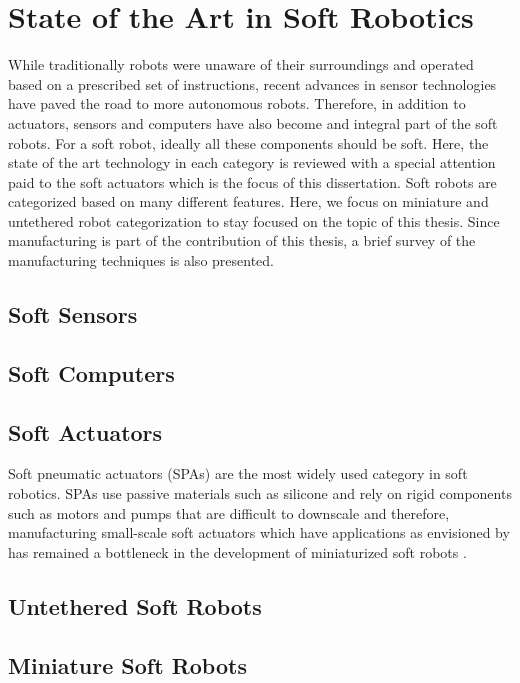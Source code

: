 \section{State of the Art in Soft Robotics}
While traditionally robots were unaware of their surroundings and operated based on a prescribed set of instructions, recent advances in sensor technologies have paved the road to more autonomous robots. Therefore, in addition to actuators, sensors and computers have also become and integral part of the soft robots. For a soft robot, ideally all these components should be soft. Here, the state of the art technology in each category is reviewed with a special attention paid to the soft actuators which is the focus of this dissertation. Soft robots are categorized based on many different features. Here, we focus on miniature and untethered robot categorization to stay focused on the topic of this thesis. Since manufacturing is part of the contribution of this thesis, a brief survey of the manufacturing techniques is also presented.
\subsection{Soft Sensors}
\subsection{Soft Computers}
\subsection{Soft Actuators}
Soft pneumatic actuators (SPAs) \cite{Gorissen2017, branyan2017soft} are the most widely used category in soft robotics. SPAs use passive materials such as silicone and rely on rigid components such as motors and pumps that are difficult to downscale and therefore, manufacturing small-scale soft actuators which have applications as envisioned by \cite{hines2017soft} has remained a bottleneck in the development of miniaturized soft robots \cite{majidi2019soft}. 
\subsection{Untethered Soft Robots}
\subsection{Miniature Soft Robots}
